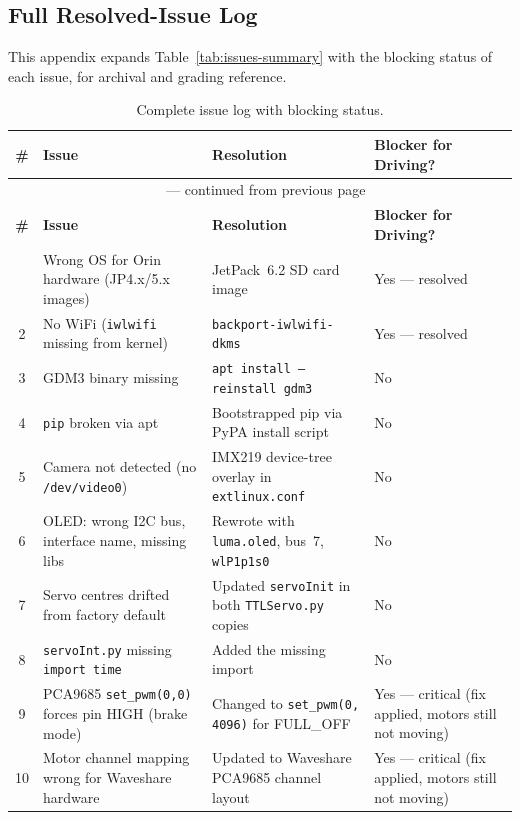\documentclass{imc-inf}
\begin{document}
\backmatter%


\typeout{}


\begin{appendices}

\chapter{Full Resolved-Issue Log}
\label{app:issue-log}

This appendix expands Table~\ref{tab:issues-summary} with the blocking status of
each issue, for archival and grading reference.

\begin{longtable}{@{}cp{1.8in}p{1.8in}p{1.2in}@{}}
\caption{Complete issue log with blocking status.}
\label{tab:issue-log}\\
\toprule
\textbf{\#} & \textbf{Issue} & \textbf{Resolution} & \textbf{Blocker for Driving?} \\
\midrule
\endfirsthead
\multicolumn{4}{c}{\tablename\ \thetable{} --- continued from previous page} \\
\toprule
\textbf{\#} & \textbf{Issue} & \textbf{Resolution} & \textbf{Blocker for Driving?} \\
\midrule
\endhead
\bottomrule
\endfoot
1 & Wrong OS for Orin hardware (JP4.x/5.x images) & JetPack~6.2 SD card image
& Yes --- resolved \\
2 & No WiFi (\texttt{iwlwifi} missing from kernel) & \texttt{backport-iwlwifi-dkms}
& Yes --- resolved \\
3 & GDM3 binary missing &
\texttt{apt install --reinstall gdm3} & No \\
4 & \texttt{pip} broken via apt &
Bootstrapped pip via PyPA install script & No \\
5 & Camera not detected (no \texttt{/dev/video0}) &
IMX219 device-tree overlay in \texttt{extlinux.conf} & No \\
6 & OLED: wrong I2C bus, interface name, missing libs &
Rewrote with \texttt{luma.oled}, bus~7, \texttt{wlP1p1s0} & No \\
7 & Servo centres drifted from factory default &
Updated \texttt{servoInit} in both \texttt{TTLServo.py} copies & No \\
8 & \texttt{servoInt.py} missing \texttt{import time} &
Added the missing import & No \\
9 & PCA9685 \texttt{set\_pwm(0,0)} forces pin HIGH (brake mode) &
Changed to \texttt{set\_pwm(0, 4096)} for FULL\_OFF &
Yes --- critical (fix applied, motors still not moving) \\
10 & Motor channel mapping wrong for Waveshare hardware &
Updated to Waveshare PCA9685 channel layout &
Yes --- critical (fix applied, motors still not moving) \\
\end{longtable}

\end{appendices}
\end{document}
